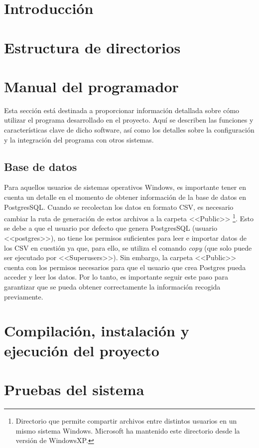 
\section{Introducción}



\section{Estructura de directorios}

\section{Manual del programador}

Esta sección está destinada a proporcionar información detallada sobre cómo utilizar el programa desarrollado en el proyecto. Aquí se describen las funciones y características clave de dicho software, así como los detalles sobre la configuración y la integración del programa con otros sistemas.

\subsection{Base de datos}
Para aquellos usuarios de sistemas operativos Windows, es importante tener en cuenta un detalle en el momento de obtener información de la base de datos en PostgresSQL. Cuando se recolectan los datos en formato CSV, es necesario cambiar la ruta de generación de estos archivos a la carpeta <<Public>> \footnote{Directorio que permite compartir archivos entre distintos usuarios en un mismo sistema Windows. Microsoft ha mantenido este directorio desde la versión de WindowsXP.}. Esto se debe a que el usuario por defecto que genera PostgresSQL (usuario <<postgres>>), no tiene los permisos suficientes para leer e importar datos de los CSV en cuestión ya que, para ello, se utiliza el comando \textit{copy} (que solo puede ser ejecutado por <<Superusers>>)\cite{Dominguez2020}. Sin embargo, la carpeta <<Public>> cuenta con los permisos necesarios para que el usuario que crea Postgres pueda acceder y leer los datos. Por lo tanto, es importante seguir este paso para garantizar que se pueda obtener correctamente la información recogida previamente.


\section{Compilación, instalación y ejecución del proyecto}

\section{Pruebas del sistema}
